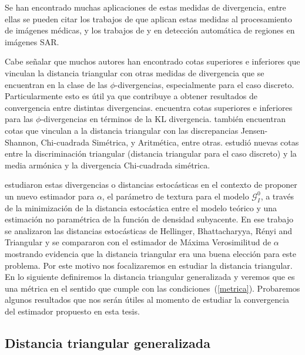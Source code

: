 Se han encontrado muchas aplicaciones de estas medidas de divergencia, entre ellas se pueden citar los trabajos de \citet{Aviyente2007} que aplican estas medidas al procesamiento de imágenes médicas, y los trabajos de \citet{ClassificationPolSARSegmentsMinimizationWishartDistances} y \citet{EdgeDetectionDistancesEntropiesJSTARS} en detección automática de regiones en imágenes SAR. 

Cabe señalar que muchos autores han encontrado cotas superiores e inferiores que vinculan la distancia triangular con otras medidas de divergencia que se encuentran en la clase de las $\phi$-divergencias, especialmente para el caso discreto. Particularmente esto es útil ya que contribuye a obtener resultados de convergencia entre distintas divergencias. \citet{Dragomir2002} encuentra cotas superiores e inferiores para las $\phi$-divergencias en términos de la KL divergencia. \citet{JainSrivastava2007} también encuentran cotas que vinculan a la distancia triangular con las discrepancias Jensen-Shannon, Chi-cuadrada Simétrica, y Aritmética, entre otras. 
\citet{Taneja2006} estudió nuevas cotas entre la discriminación triangular (distancia triangular para el caso discreto) y la media armónica y la  divergencia Chi-cuadrada simétrica.

\citet{APSAR2013ParameterEstimationStochasticDistances} estudiaron estas divergencias o distancias estocásticas en el contexto de proponer un nuevo estimador para $\alpha$, el parámetro de textura para el modelo $\mathcal{G}_I^0$, a través de la minimización de la distancia estocástica entre el modelo teórico y una estimación no paramétrica de la función de densidad subyacente. En ese trabajo se analizaron las distancias estocásticas de Hellinger, Bhattacharyya, R\'enyi and Triangular y se compararon con el estimador de Máxima Verosimilitud de $\alpha$ mostrando evidencia que la distancia triangular era una buena elección para este problema. 
Por este motivo nos focalizaremos en estudiar la distancia triangular. 
En lo siguiente definiremos la distancia triangular generalizada y veremos que es una métrica en el sentido que cumple con las condiciones~(\ref{metrica}). 
Probaremos algunos resultados que nos serán útiles al momento de estudiar la convergencia del estimador propuesto en esta tesis.

\subsection{Distancia triangular generalizada}

